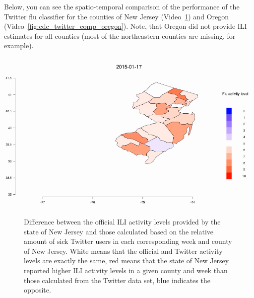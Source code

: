 \documentclass[11pt, a4paper,twoside]{report}\usepackage[]{graphicx}\usepackage[]{color}
\begin{document}
Below, you can see the spatio-temporal comparison of the performance of the Twitter flu classifier for the counties of New Jersey (Video~\ref{fig:cdc_twitter_comp_jersey}) and Oregon (Video~\ref{fig:cdc_twitter_comp_oregon}). Note, that Oregon did not provide ILI estimates for all counties (most of the northeastern counties are missing, for example).

\begin{center}
\href{run:vids/5_cdc_twitter_diff_user_jersey.avi}{\includegraphics[width=0.9\linewidth]{vids/5_cdc_twitter_diff_user_jersey.png}}
\end{center}
\begin{figure}[H]
\centering
  \caption{Difference between the official ILI activity levels provided by the state of New Jersey and those calculated based on the relative amount of sick Twitter users in each corresponding week and county of New Jersey. White means that the official and Twitter activity levels are exactly the same, red means that the state of New Jersey reported higher ILI activity levels in a given county and week than those calculated from the Twitter data set, blue indicates the opposite.}
    \label{fig:cdc_twitter_comp_jersey}
\end{figure}
\end{document}
